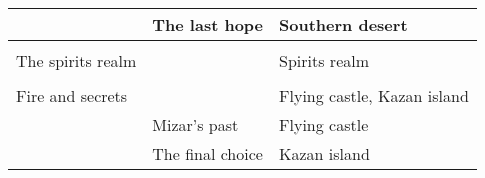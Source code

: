 \begin{table}[H]
\begin{tabular}{|lll|}
\multicolumn{1}{|l|}{}                                       & \multicolumn{1}{l|}{The last hope}                             & Southern desert             \\ \hline
                                                             &                                                                &                             \\ \hline
\multicolumn{1}{|l|}{The spirits realm}                      & \multicolumn{1}{l|}{}                                          & Spirits realm               \\ \hline
                                                             &                                                                &                             \\ \hline
\multicolumn{1}{|l|}{Fire and secrets}                       & \multicolumn{1}{l|}{}                                          & Flying castle, Kazan island \\ \hline
\multicolumn{1}{|l|}{}                                       & \multicolumn{1}{l|}{Mizar's past}                              & Flying castle               \\ \hline
\multicolumn{1}{|l|}{}                                       & \multicolumn{1}{l|}{The final choice}                          & Kazan island                \\ \hline
\end{tabular}
\end{table}